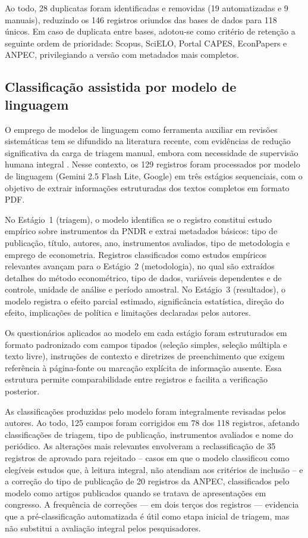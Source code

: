 Ao todo, 28 duplicatas foram identificadas e removidas (19 automatizadas e 9 manuais), reduzindo os 146 registros oriundos das bases de dados para 118 únicos. Em caso de duplicata entre bases, adotou-se como critério de retenção a seguinte ordem de prioridade: Scopus, SciELO, Portal CAPES, EconPapers e ANPEC, privilegiando a versão com metadados mais completos.

\subsection{Classificação assistida por modelo de linguagem}
\label{subsec:metodo-classificacao-llm}

O emprego de modelos de linguagem como ferramenta auxiliar em revisões sistemáticas tem se difundido na literatura recente, com evidências de redução significativa da carga de triagem manual, embora com necessidade de supervisão humana integral \cite{DelgadoChaves2025,Scherbakov2025}. Nesse contexto, os 129 registros foram processados por modelo de linguagem (Gemini 2.5 Flash Lite, Google) em três estágios sequenciais, com o objetivo de extrair informações estruturadas dos textos completos em formato PDF.

No Estágio~1 (triagem), o modelo identifica se o registro constitui estudo empírico sobre instrumentos da PNDR e extrai metadados básicos: tipo de publicação, título, autores, ano, instrumentos avaliados, tipo de metodologia e emprego de econometria. Registros classificados como estudos empíricos relevantes avançam para o Estágio~2 (metodologia), no qual são extraídos detalhes do método econométrico, tipo de dados, variáveis dependentes e de controle, unidade de análise e período amostral. No Estágio~3 (resultados), o modelo registra o efeito parcial estimado, significância estatística, direção do efeito, implicações de política e limitações declaradas pelos autores.

Os questionários aplicados ao modelo em cada estágio foram estruturados em formato padronizado com campos tipados (seleção simples, seleção múltipla e texto livre), instruções de contexto e diretrizes de preenchimento que exigem referência à página-fonte ou marcação explícita de informação ausente. Essa estrutura permite comparabilidade entre registros e facilita a verificação posterior.

As classificações produzidas pelo modelo foram integralmente revisadas pelos autores. Ao todo, 125 campos foram corrigidos em 78 dos 118 registros, afetando classificações de triagem, tipo de publicação, instrumentos avaliados e nome do periódico. As alterações mais relevantes envolveram a reclassificação de 35 registros de aprovado para rejeitado -- casos em que o modelo classificou como elegíveis estudos que, à leitura integral, não atendiam aos critérios de inclusão -- e a correção do tipo de publicação de 20 registros da ANPEC, classificados pelo modelo como artigos publicados quando se tratava de apresentações em congresso. A frequência de correções --- em dois terços dos registros --- evidencia que a pré-classificação automatizada é útil como etapa inicial de triagem, mas não substitui a avaliação integral pelos pesquisadores.

